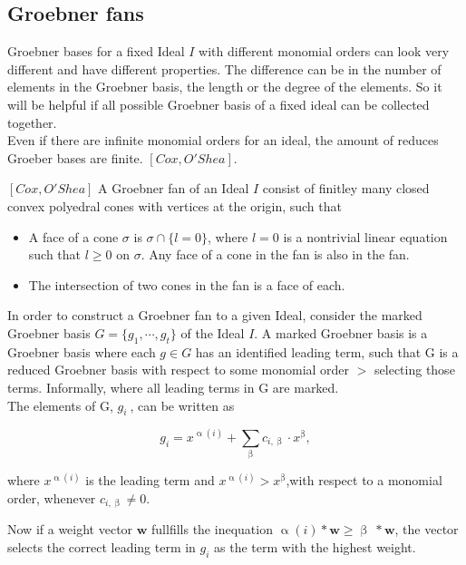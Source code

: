 \subsection{Groebner fans}
\label{subsec:Groebnerfan}
 Groebner bases for a fixed Ideal $I$ with different monomial orders can look very different and have different properties. The difference can be in the number of elements in the Groebner basis, the length or the degree of the elements. So it will be helpful if all 
possible Groebner basis of a fixed ideal can be collected together.\\
Even if there are infinite monomial orders for an ideal, the amount of reduces Groeber bases are finite. $\left[ Cox,O'Shea\right]$.
 
\begin{env_definition}
$\left[ Cox,O'Shea\right]  $ A Groebner fan of an Ideal $I$ consist of finitley many closed convex polyedral cones with vertices at the origin, such that

\begin{itemize}
\item
A face of a cone $\sigma$ is $\sigma \cap \lbrace l=0\rbrace$, where $l=0$ is a nontrivial linear equation such that $l \geq 0$ on $\sigma$.
Any face of a cone in the fan is also in the fan.
\item
The intersection of two cones in the fan is a face of each.
\end{itemize}

\end{env_definition}

In order to construct a Groebner fan to a given Ideal, consider the marked Groebner basis $G = \lbrace g_{1},\cdots,g_{t}\rbrace $ of the Ideal $I$.
A marked Groebner basis is a Groebner basis where each $g \in G$ has an identified leading term, such that G is a reduced Groebner basis with respect to some monomial order $>$ selecting those terms.
Informally, where all leading terms in G are marked.\\
\newline
The elements of G, $g_{i}~$, can be written as
\begin{center}
\[ g_{i} = x^{\upalpha\left( i\right) } +  \sum_{\upbeta} c_{i,\upbeta} \cdot x^{\upbeta}, \] 
\end{center}
where $ x^{\upalpha\left( i\right) }$ is the leading term and $ x^{\upalpha\left( i\right) } > x^{\upbeta} $,with respect to a monomial order, whenever $c_{i,\upbeta} \neq 0 $.

Now if a weight vector $\textbf{w}$ fullfills the inequation
$\upalpha\left( i\right) \ast \textbf{w} \geq \upbeta~\ast\textbf{w}$, the vector selects the correct leading term in $g_{i}$ as the term with the highest weight.\\

